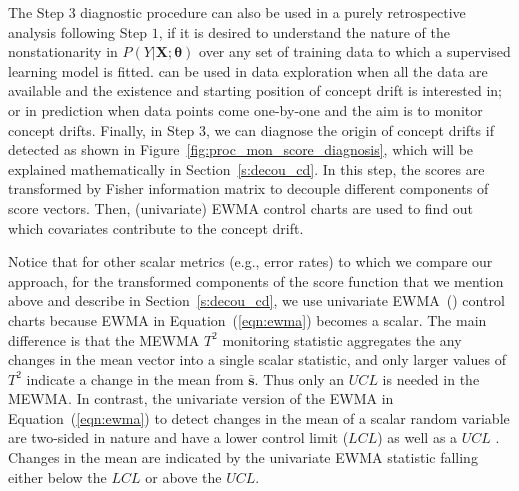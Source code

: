 \documentclass[twoside,11pt]{article}
\begin{document}
The Step $3$ diagnostic procedure can also be used in a purely retrospective analysis following Step $1$, if it is desired to understand the nature of the nonstationarity in $P(Y|\bm{X};\bm{\theta})$ over any set of training data to which a supervised learning model is fitted.
can be used in data exploration when all the data are available and the existence and starting position of concept drift is interested in; or in prediction when data points come one-by-one and the aim is to monitor concept drifts. Finally, in Step 3, we can diagnose the origin of concept drifts if detected as shown in Figure~\ref{fig:proc_mon_score_diagnosis}, which will be explained mathematically in Section~\ref{s:decou_cd}. In this step, the scores are transformed by Fisher information matrix to decouple different components of score vectors. Then, (univariate) EWMA control charts are used to find out which covariates contribute to the concept drift.
 
Notice that for other scalar metrics (e.g., error rates) to which we compare our approach, for the transformed components of the score function that we mention above and describe in Section~\ref{s:decou_cd}, we use univariate EWMA~(\cite{roberts1959control}) control charts because EWMA in Equation~(\ref{eqn:ewma}) becomes a scalar. The main difference is that the MEWMA $T^2$ monitoring statistic aggregates the any changes in the mean vector into a single scalar statistic, and only larger values of $T^2$ indicate a change in the mean from $\bar{\bm{s}}$. Thus only an $UCL$  is needed in the MEWMA. In contrast, the univariate version of the EWMA in Equation~(\ref{eqn:ewma}) to detect changes in the mean of a scalar random variable are two-sided in nature and have a lower control limit ($LCL$) as well as a $UCL$ . Changes in the mean are indicated by the univariate EWMA statistic falling either below the $LCL$ or above the $UCL$.

\end{document}
